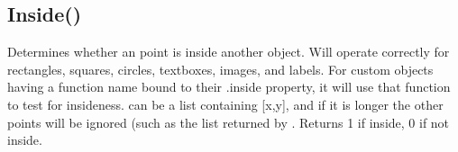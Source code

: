 \documentclass[letterpaper,10pt,english]{sphinxmanual}
\begin{document}
\ignorespaces 

\subsection{Inside()}
\label{\detokenize{reference/utility:inside}}\label{\detokenize{reference/utility:index-21}}
\sphinxAtStartPar
{}

\sphinxAtStartPar
{}

\sphinxAtStartPar
Determines whether an \sphinxcode{\sphinxupquote{{[}x,y{]}}} point is inside another   object.  Will operate correctly for rectangles, squares, circles,   textboxes, images, and labels. For custom objects having a function name bound to their .inside property, it will use that function to test for insideness. \sphinxcode{\sphinxupquote{{[}xylist{]}}} can be a list containing   {[}x,y{]}, and if it is longer the other points will be ignored (such as   the list returned by .  Returns 1 if inside, 0   if not inside.

\sphinxAtStartPar
{}

\begin{sphinxVerbatim}[commandchars=\\\{\}]
\end{sphinxVerbatim}

\sphinxAtStartPar
{}

\begin{sphinxVerbatim}[commandchars=\\\{\}]

\end{sphinxVerbatim}
\end{document}
